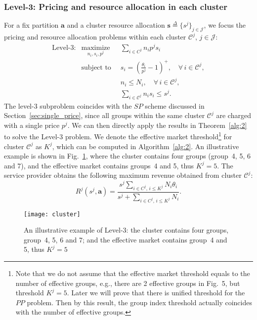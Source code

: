 \documentclass[twocolumn,10pt,twosided]{IEEEtran}
\begin{document}
\subsubsection{Level-3: Pricing and resource allocation in each cluster}
 For a fix partition $\boldsymbol{a}$ and a cluster resource allocation $\boldsymbol{s}\overset{\Delta}{=}\{s^j\}_{j\in\mathcal{J}}$, we focus the pricing and resource allocation
problems within each cluster $\mathcal{C}^j$, $j\in \mathcal{J}$:
\begin{eqnarray*}
   \text{Level-3:}
 & \underset{n_i,s_i,p^j}{{\text{maximize}}}\;\; &\sum_{i\in C^j} n_ip^js_i  \nonumber\\
    &\text{subject to}\;\; & s_i =\left(\frac{\theta_i }{p^j } - 1\right)^+,\quad \forall\, i\in \mathcal{C}^j, \\
    &&  n_i \le N_i, \quad \forall\, i\in \mathcal{C}^j,\\
    && \sum\limits_{i\in \mathcal{C}^j} n_i s_i \le s^j. 
\end{eqnarray*}
The level-3 subproblem coincides with the $SP$ scheme  discussed in Section~\ref{sec:single_price}, since all groups within the same cluster $\mathcal{C}^j$ are charged with a single price $p^j$. We can then directly apply the results in Theorem~\ref{alg:2} to solve the Level-3 problem. We denote the effective market threshold\footnote{Note that we do not assume that the effective market threshold equals to the number of effective groups, e.g., there are 2 effective groups in Fig.~5, but threshold $K^j=5$. Later we will prove that there is unified threshold for the $PP$ problem. Then by this result, the group index threshold actually coincides with the number of effective groups.} for cluster $\mathcal{C}^j$  as $K^j$, which can be computed in Algorithm~\ref{alg:2}. An illustrative  example is shown in Fig.~\ref{fig:cluster}, where the cluster contains four groups (group~4, 5, 6 and 7), and the effective market contains groups~4 and 5, thus $K^j=5$. The service provider obtains the following maximum revenue obtained from cluster $\mathcal{C}^j$:
\begin{equation}
\label{eq:ppd_level_3}
R^j(s^j,\boldsymbol{a})=\frac{s^j \sum_{i\in C^j, \,i\le K^j}N_i\theta_i}{s^j +\sum_{i\in C^j, \,i\le K^j}N_i}.
\end{equation}
\begin{figure}[ht]
\centering
\texttt{[image: cluster]}
\caption{An illustrative  example of Level-3: the cluster contains four groups, group~4, 5, 6 and 7; and the effective market contains group~4 and 5, thus $K^j=5$}
\label{fig:cluster}
\end{figure}
\end{document}
